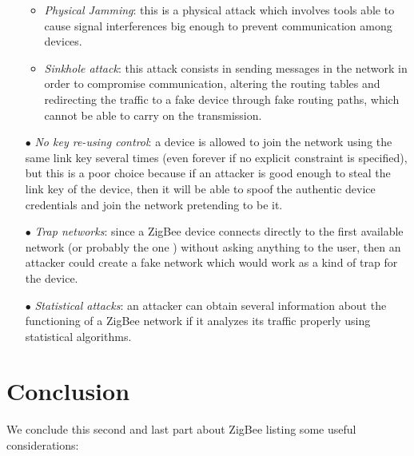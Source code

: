 \documentclass[12pt]{report}
\begin{document}
\begin{itemize}
\begin{itemize}
\item \emph{Physical Jamming}: this is a physical attack which involves tools able to cause signal interferences big enough to prevent communication among devices.\\

\item \emph{Sinkhole attack}: this attack consists in sending messages in the network in order to compromise communication, altering the routing tables and redirecting the traffic to a fake device through fake routing paths, which cannot be able to carry on the transmission.
\end{itemize}

\item[$\bullet$] \emph{No key re-using control}: a device is allowed to join the network using the same link key several times (even forever if no explicit constraint is specified), but this is a poor choice because if an attacker is good enough to steal the link key of the device, then it will be able to spoof the authentic device credentials and join the network pretending to be it.

\item[$\bullet$] \emph{Trap networks}: since a ZigBee device connects directly to the first available network (or probably the one ) without asking anything to the user, then an attacker could create a fake network which would work as a kind of trap for the device.

\item[$\bullet$] \emph{Statistical attacks}: an attacker can obtain several information about the functioning of a ZigBee network if it analyzes its traffic properly using statistical algorithms.\\ 
\end{itemize}

\clearpage
\section{Conclusion}
\bigskip
We conclude this second and last part about ZigBee listing some useful considerations:
\end{document}
